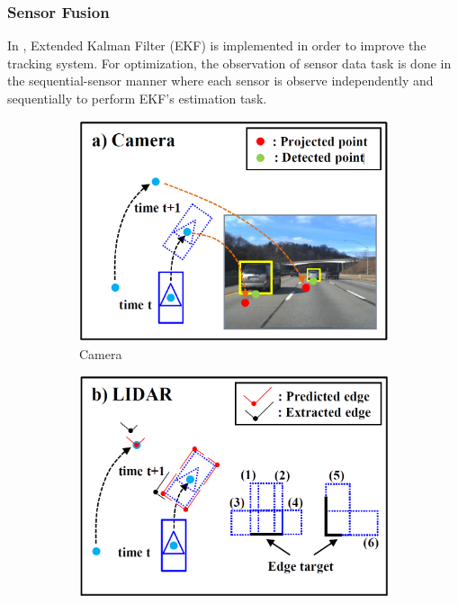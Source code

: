 \subsubsection{Sensor Fusion}
In \cite{Cho_2014}, Extended Kalman Filter (EKF) is implemented in order to improve the tracking system. For optimization, the observation of sensor data task is done in the sequential-sensor manner where each sensor is observe independently and sequentially to perform EKF’s estimation task.
\begin{figure}
    \centering
    \begin{subfigure}[b]{0.3\textwidth}
        \includegraphics[width=\textwidth]{src/pic/obstacle_a.png}
        \caption{Camera}
        \label{fig:obstacle_a}
    \end{subfigure}
    \begin{subfigure}[b]{0.3\textwidth}
        \includegraphics[width=\textwidth]{src/pic/obstacle_b.png}

\end{subfigure}
\end{figure}
